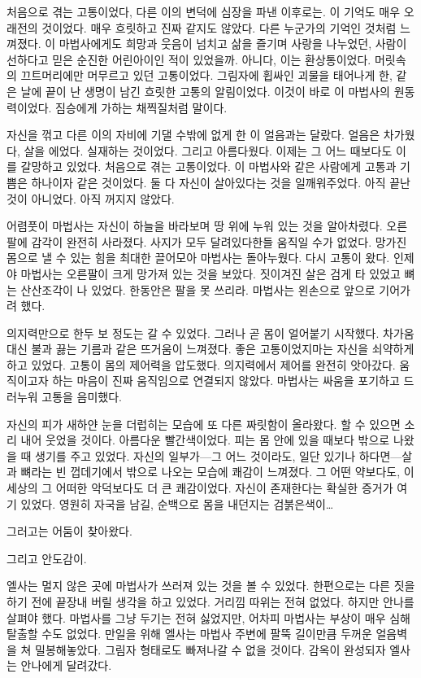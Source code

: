 처음으로 겪는 고통이었다, 다른 이의 변덕에 심장을 파낸 이후로는. 이 기억도 매우 오래전의 것이었다. 매우 흐릿하고 진짜 같지도 않았다. 다른 누군가의 기억인 것처럼 느껴졌다. 이 마법사에게도 희망과 웃음이 넘치고 삶을 즐기며 사랑을 나누었던, 사람이 선하다고 믿은 순진한 어린아이인 적이 있었을까. 아니다, 이는 환상통이었다. 머릿속의 끄트머리에만 머무르고 있던 고통이었다. 그림자에 휩싸인 괴물을 태어나게 한, 같은 날에 끝이 난 생명이 남긴 흐릿한 고통의 알림이었다. 이것이 바로 이 마법사의 원동력이었다. 짐승에게 가하는 채찍질처럼 말이다.

자신을 꺾고 다른 이의 자비에 기댈 수밖에 없게 한 이 얼음과는 달랐다. 얼음은 차가웠다, 살을 에었다. 실재하는 것이었다. 그리고 아름다웠다. 이제는 그 어느 때보다도 이를 갈망하고 있었다. 처음으로 겪는 고통이었다. 이 마법사와 같은 사람에게 고통과 기쁨은 하나이자 같은 것이었다. 둘 다 자신이 살아있다는 것을 일깨워주었다. 아직 끝난 것이 아니었다. 아직 꺼지지 않았다.

어렴풋이 마법사는 자신이 하늘을 바라보며 땅 위에 누워 있는 것을 알아차렸다. 오른팔에 감각이 완전히 사라졌다. 사지가 모두 달려있다한들 움직일 수가 없었다. 망가진 몸으로 낼 수 있는 힘을 최대한 끌어모아 마법사는 돌아누웠다. 다시 고통이 왔다. 인제야 마법사는 오른팔이 크게 망가져 있는 것을 보았다. 짓이겨진 살은 검게 타 있었고 뼈는 산산조각이 나 있었다. 한동안은 팔을 못 쓰리라. 마법사는 왼손으로 앞으로 기어가려 했다.

의지력만으로 한두 보 정도는 갈 수 있었다. 그러나 곧 몸이 얼어붙기 시작했다. 차가움 대신 불과 끓는 기름과 같은 뜨거움이 느껴졌다. 좋은 고통이었지마는 자신을 쇠약하게 하고 있었다. 고통이 몸의 제어력을 압도했다. 의지력에서 제어를 완전히 앗아갔다. 움직이고자 하는 마음이 진짜 움직임으로 연결되지 않았다. 마법사는 싸움을 포기하고 드러누워 고통을 음미했다.

자신의 피가 새하얀 눈을 더럽히는 모습에 또 다른 짜릿함이 올라왔다. 할 수 있으면 소리 내어 웃었을 것이다. 아름다운 빨간색이었다. 피는 몸 안에 있을 때보다 밖으로 나왔을 때 생기를 주고 있었다. 자신의 일부가—그 어느 것이라도, 일단 있기나 하다면—살과 뼈라는 빈 껍데기에서 밖으로 나오는 모습에 쾌감이 느껴졌다. 그 어떤 약보다도, 이 세상의 그 어떠한 악덕보다도 더 큰 쾌감이었다. 자신이 존재한다는 확실한 증거가 여기 있었다. 영원히 자국을 남길, 순백으로 몸을 내던지는 검붉은색이\ldots

그러고는 어둠이 찾아왔다.

그리고 안도감이.

\textbreak

엘사는 멀지 않은 곳에 마법사가 쓰러져 있는 것을 볼 수 있었다. 한편으로는 다른 짓을 하기 전에 끝장내 버릴 생각을 하고 있었다. 거리낌 따위는 전혀 없었다. 하지만 안나를 살펴야 했다. 마법사를 그냥 두기는 전혀 싫었지만, 어차피 마법사는 부상이 매우 심해 탈출할 수도 없었다. 만일을 위해 엘사는 마법사 주변에 팔뚝 길이만큼 두꺼운 얼음벽을 쳐 밀봉해놓았다. 그림자 형태로도 빠져나갈 수 없을 것이다. 감옥이 완성되자 엘사는 안나에게 달려갔다.

